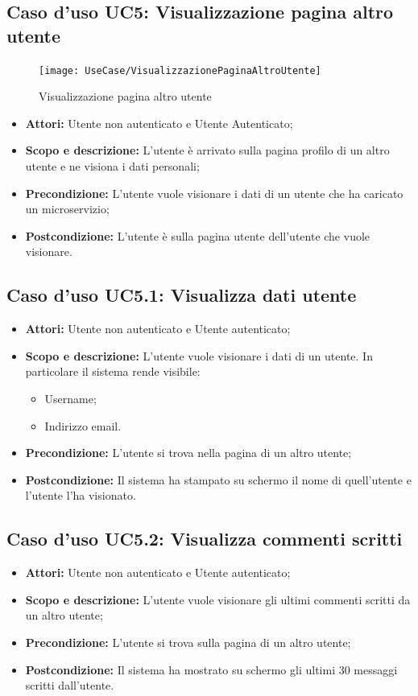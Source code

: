 \documentclass[12pt,a4paper,titlepage]{article}
\begin{document}
	\subsection{Caso d'uso UC5: Visualizzazione pagina altro utente}
	\label{UC5}
	\begin{figure}[H]
		\centering
		\texttt{[image: UseCase/VisualizzazionePaginaAltroUtente]}
		\caption{Visualizzazione pagina altro utente}
	\end{figure}
	\begin{itemize}
		\item \textbf{Attori: }Utente non autenticato e Utente Autenticato;
		\item \textbf{Scopo e descrizione: }L'utente è arrivato sulla pagina profilo di un altro utente e ne visiona i dati personali;
		\item \textbf{Precondizione: }L'utente vuole visionare i dati di un utente che ha caricato un microservizio;
		\item \textbf{Postcondizione: }L'utente è sulla pagina utente dell'utente che vuole visionare.
	\end{itemize}
	\subsection{Caso d'uso UC5.1: Visualizza dati utente}
	\label{UC5.1}
	\begin{itemize}
		\item \textbf{Attori: }Utente non autenticato e Utente autenticato;
		\item \textbf{Scopo e descrizione: }L'utente vuole visionare i dati di un utente. In particolare il sistema rende visibile:
		\begin{itemize}
			\item Username;
			\item Indirizzo email.
		\end{itemize}
		\item \textbf{Precondizione: }L'utente si trova nella pagina di un altro utente;
		\item \textbf{Postcondizione: }Il sistema ha stampato su schermo il nome di quell'utente e l'utente l'ha visionato.
	\end{itemize}
	\subsection{Caso d'uso UC5.2: Visualizza commenti scritti}
	\label{UC5.2}
	\begin{itemize}
		\item \textbf{Attori: }Utente non autenticato e Utente autenticato;
		\item \textbf{Scopo e descrizione: }L'utente vuole visionare gli ultimi commenti scritti da un altro utente;
		\item \textbf{Precondizione: }L'utente si trova sulla pagina di un altro utente;
		\item \textbf{Postcondizione: }Il sistema ha mostrato su schermo gli ultimi 30 messaggi scritti dall'utente.
	\end{itemize}
\end{document}
